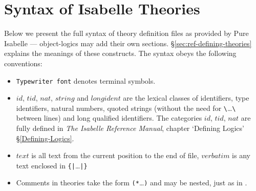 
\appendix
{}  %

\chapter{Syntax of Isabelle Theories}\label{app:TheorySyntax}

Below we present the full syntax of theory definition files as provided by
Pure Isabelle --- object-logics may add their own sections.
\S\ref{sec:ref-defining-theories} explains the meanings of these constructs.
The syntax obeys the following conventions:
\begin{itemize}
\item {\tt Typewriter font} denotes terminal symbols.
  
\item $id$, $tid$, $nat$, $string$ and $longident$ are the lexical
  classes of identifiers, type identifiers, natural numbers, quoted
  strings (without the need for \verb$\$\dots\verb$\$ between lines)
  and long qualified \ML{} identifiers.
  The categories $id$, $tid$, $nat$ are fully defined in %
  {{\it The Isabelle Reference Manual}, chapter `Defining Logics'}%
  {\S\ref{Defining-Logics}}.
  
\item $text$ is all text from the current position to the end of file,
  $verbatim$ is any text enclosed in \verb.{|.\dots\verb.|}.
  
\item Comments in theories take the form {\tt (*}\dots{\tt*)} and may
  be nested, just as in \ML.
\end{itemize}

